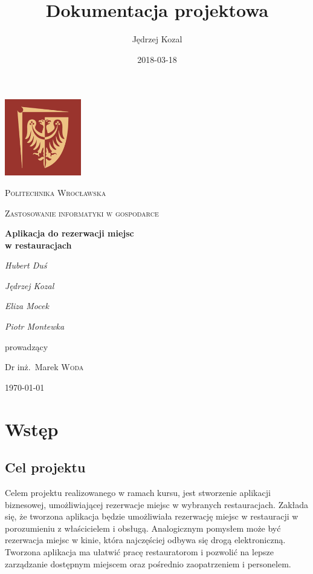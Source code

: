 \documentclass{article}
\title{Dokumentacja projektowa}
\date{2018-03-18}
\author{Jędrzej Kozal}
\begin{document}
\begin{titlepage}
	\centering
	\includegraphics[width=0.25\textwidth]{logo_pol_wroclaw.png}\par\vspace{1cm}
	{\scshape\LARGE Politechnika Wrocławska \par}
	\vspace{1cm}
	{\scshape\Large Zastosowanie informatyki w gospodarce\par}
	\vspace{1.5cm}
	{\huge\bfseries Aplikacja do rezerwacji miejsc \\w restauracjach \par}
	\vspace{2cm}
	{\Large\itshape Hubert Duś\par}
	{\Large\itshape Jędrzej Kozal\par}
	{\Large\itshape Eliza Mocek\par}
	{\Large\itshape Piotr Montewka\par}

	\vfill
	prowadzący\par
	Dr inż.~Marek \textsc{Woda}

	\vfill

	{\large \today\par}
\end{titlepage}

\tableofcontents
\newpage


\section{Wstęp}

\subsection{Cel projektu}
Celem projektu realizowanego w ramach kursu, jest stworzenie aplikacji biznesowej, umożliwiającej rezerwacje miejsc w wybranych restauracjach. Zakłada się, że tworzona aplikacja będzie umożliwiała rezerwację miejsc w restauracji w porozumieniu z właścicielem i obsługą. Analogicznym pomysłem może być rezerwacja miejsc w kinie, która najczęściej odbywa się drogą elektroniczną. Tworzona aplikacja ma ułatwić pracę restauratorom i pozwolić na lepsze zarządzanie dostępnym miejscem oraz pośrednio zaopatrzeniem i personelem.
\end{document}
